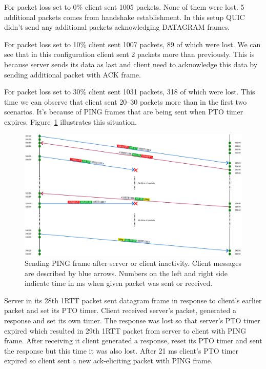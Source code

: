 For packet loss set to 0\% client sent 1005 packets.
None of them were lost.
5 additional packets comes from handshake establishment.
In this setup QUIC didn't send any additional packets acknowledging DATAGRAM frames.

For packet loss set to 10\% client sent 1007 packets, 89 of which were lost.
We can see that in this configuration client sent 2 packets more than previously.
This is because server sends its data as last and client need to acknowledge this data by sending additional packet with ACK frame.

For packet loss set to 30\% client sent 1031 packets, 318 of which were lost.
This time we can observe that client sent 20--30 packets more than in the first two scenarios.
It's because of PING frames that are being sent when PTO timer expires.
Figure~\ref{fig:dgram_ping_frames} illustrates this situation.

\begin{figure}
    \centering
    \includegraphics[width=\textwidth]{img/__09__datagrams/dgram_retransmission_ping.png}
    \caption{Sending PING frame after server or client inactivity.
    Client messages are described by blue arrows.
    Numbers on the left and right side indicate time in ms when given packet was sent or received.}
    \label{fig:dgram_ping_frames}
\end{figure}

Server in its 28th 1RTT packet sent datagram frame in response to client's earlier packet and set its PTO timer.
Client received server's packet, generated a response and set its own timer.
The response was lost so that server's PTO timer expired which resulted in 29th 1RTT packet from server to client with PING frame.
After receiving it client generated a response, reset its PTO timer and sent the response but this time it was also lost.
After 21 ms client's PTO timer expired so client sent a new ack-eliciting packet with PING frame.
